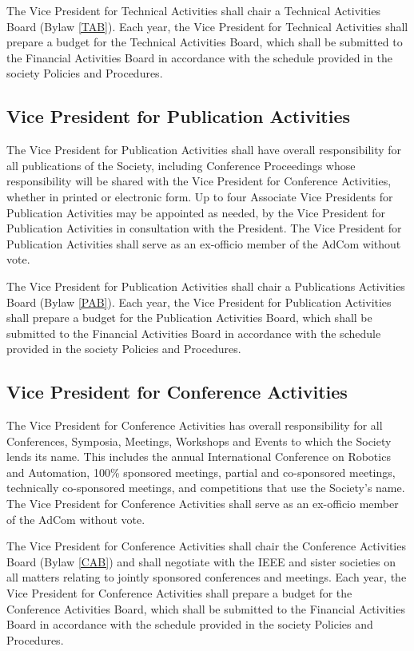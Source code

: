 \documentclass[10pt]{article}
\newcommand{\blref}[1]{Bylaw \ref{#1}}
\begin{document}
The Vice President for Technical Activities shall chair a Technical Activities Board (\blref{TAB}). Each year, the Vice President for Technical Activities shall prepare a budget for the Technical Activities Board, which shall be submitted to the Financial Activities Board in accordance with the schedule provided in the society Policies and Procedures.



\subsection{Vice President for Publication Activities}

The Vice President for Publication Activities shall have overall responsibility for all publications of the Society, including Conference Proceedings whose responsibility will be shared with the Vice President for Conference Activities, whether in printed or electronic form.  Up to four Associate Vice Presidents for Publication Activities may be appointed as needed, by the Vice President for Publication Activities in consultation with the President. The Vice President for Publication Activities shall serve as an ex-officio member of the AdCom without vote.

The Vice President for Publication Activities shall chair a Publications Activities Board (\blref{PAB}). Each year, the Vice President for Publication Activities shall prepare a budget for the Publication Activities Board, which shall be submitted to the Financial Activities Board in accordance with the schedule provided in the society Policies and Procedures.



\subsection{Vice President for Conference Activities}

The Vice President for Conference Activities has overall responsibility for all Conferences, Symposia, Meetings, Workshops and Events to which the Society lends its name. This includes the annual International Conference on Robotics and Automation, 100\% sponsored meetings, partial and co-sponsored meetings, technically co-sponsored meetings, and competitions that use the Society's name. The Vice President for Conference Activities shall serve as an ex-officio member of the AdCom without vote.

The Vice President for Conference Activities shall chair the Conference Activities Board (\blref{CAB}) and shall negotiate with the IEEE and sister societies on all matters relating to jointly sponsored conferences and meetings. Each year, the Vice President for Conference Activities shall prepare a budget for the Conference Activities Board, which shall be submitted to the Financial Activities Board in accordance with the schedule provided in the society Policies and Procedures. 
\end{document}

